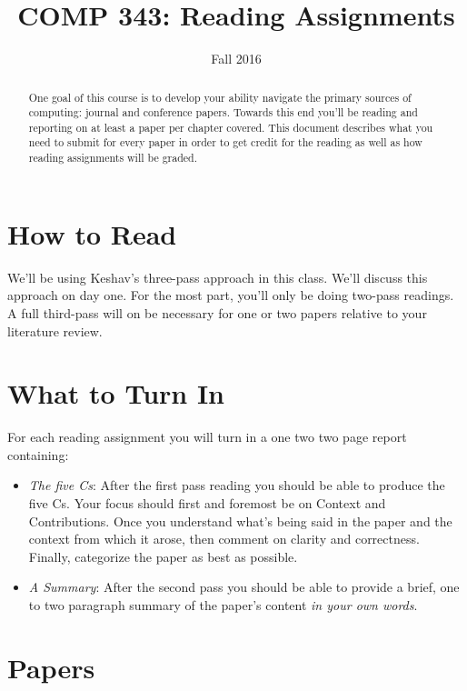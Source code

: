 \documentclass[]{tufte-handout}
\title{COMP 343: Reading Assignments}
\author{  }
\date{Fall 2016}
\begin{document}
\maketitle

\begin{abstract}
  One goal of this course is to develop your ability navigate the primary sources of computing: journal and conference papers. Towards this end you'll be reading and reporting on at least a paper per chapter covered. This document describes what you need to submit for every paper in order to get credit for the reading as well as how reading assignments will be graded.
\end{abstract}

\section{How to Read}

We'll be using Keshav's three-pass approach in this class\cite{Keshav}. We'll discuss this approach on day one. For the most part, you'll only be doing two-pass readings. A full third-pass will on be necessary for one or two papers relative to your literature review.

\section{What to Turn In}

For each reading assignment you will turn in a one two two page report containing:
\begin{itemize}
  \item \textit{The five Cs}: \newline After the first pass reading you should be able to produce the five Cs. Your focus should first and foremost be on Context and Contributions. Once you understand what's being said in the paper and the context from which it arose, then comment on clarity and correctness. Finally, categorize the paper as best as possible.
  \item \textit{A Summary}: \newline After the second pass you should be able to provide a brief, one to two paragraph summary of the paper's content \textit{in your own words}.
\end{itemize}

\section{Papers}
\end{document}
